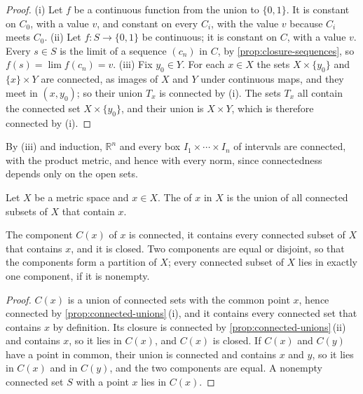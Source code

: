 \begin{proof}
(i) Let $f$ be a continuous function from the union to $\{0,1\}$. It is constant on $C_0$, with a value $v$, and constant on every $C_i$, with the value $v$ because $C_i$ meets $C_0$. (ii) Let $f\colon S\to\{0,1\}$ be continuous; it is constant on $C$, with a value $v$. Every $s\in S$ is the limit of a sequence $(c_n)$ in $C$, by \cref{prop:closure-sequences}, so $f(s)=\lim f(c_n)=v$. (iii) Fix $y_0\in Y$. For each $x\in X$ the sets $X\times\{y_0\}$ and $\{x\}\times Y$ are connected, as images of $X$ and $Y$ under continuous maps, and they meet in $(x,y_0)$; so their union $T_x$ is connected by (i). The sets $T_x$ all contain the connected set $X\times\{y_0\}$, and their union is $X\times Y$, which is therefore connected by (i).
\end{proof}

By (iii) and induction, $\mathbb R^n$ and every box $I_1\times\cdots\times I_n$ of intervals are connected, with the product metric, and hence with every norm, since connectedness depends only on the open sets.

\begin{definition}[Component]
\label{def:component}
Let $X$ be a metric space and $x\in X$. The  of $x$ in $X$ is the union of all connected subsets of $X$ that contain $x$.
\end{definition}

\begin{proposition}[Components]
\label{prop:components}
The component $C(x)$ of $x$ is connected, it contains every connected subset of $X$ that contains $x$, and it is closed. Two components are equal or disjoint, so that the components form a partition of $X$; every connected subset of $X$ lies in exactly one component, if it is nonempty.
\end{proposition}

\begin{proof}
$C(x)$ is a union of connected sets with the common point $x$, hence connected by \cref{prop:connected-unions}\,(i), and it contains every connected set that contains $x$ by definition. Its closure is connected by \cref{prop:connected-unions}\,(ii) and contains $x$, so it lies in $C(x)$, and $C(x)$ is closed. If $C(x)$ and $C(y)$ have a point in common, their union is connected and contains $x$ and $y$, so it lies in $C(x)$ and in $C(y)$, and the two components are equal. A nonempty connected set $S$ with a point $x$ lies in $C(x)$.
\end{proof}

